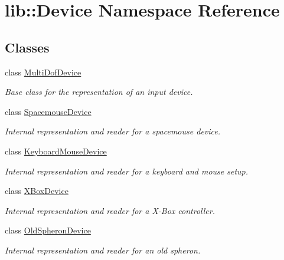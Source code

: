 \hypertarget{namespacelib_1_1Device}{\section{lib\-:\-:\-Device \-Namespace \-Reference}
\label{namespacelib_1_1Device}
}
\subsection*{\-Classes}
\begin{DoxyCompactItemize}
\item 
class \hyperlink{classlib_1_1Device_1_1MultiDofDevice}{\-Multi\-Dof\-Device}
\begin{DoxyCompactList}\small\item\em \-Base class for the representation of an input device. \end{DoxyCompactList}\item 
class \hyperlink{classlib_1_1Device_1_1SpacemouseDevice}{\-Spacemouse\-Device}
\begin{DoxyCompactList}\small\item\em \-Internal representation and reader for a spacemouse device. \end{DoxyCompactList}\item 
class \hyperlink{classlib_1_1Device_1_1KeyboardMouseDevice}{\-Keyboard\-Mouse\-Device}
\begin{DoxyCompactList}\small\item\em \-Internal representation and reader for a keyboard and mouse setup. \end{DoxyCompactList}\item 
class \hyperlink{classlib_1_1Device_1_1XBoxDevice}{\-X\-Box\-Device}
\begin{DoxyCompactList}\small\item\em \-Internal representation and reader for a \-X-\/\-Box controller. \end{DoxyCompactList}\item 
class \hyperlink{classlib_1_1Device_1_1OldSpheronDevice}{\-Old\-Spheron\-Device}
\begin{DoxyCompactList}\small\item\em \-Internal representation and reader for an old spheron. \end{DoxyCompactList}\end{DoxyCompactItemize}
